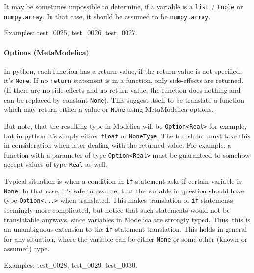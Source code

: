 \documentclass[a4paper,10pt]{article}
\begin{document}
It may be sometimes impossible to determine, if a variable is a {\tt list} / {\tt tuple} or {\tt numpy.array}. In that case,
it should be assumed to be {\tt numpy.array}.

Examples: test\_0025,  test\_0026,  test\_0027.


\paragraph{Options (MetaModelica)}
In python, each function has a return value, if the return value is not specified, it's {\tt None}. 
If no {\tt return} statement is in a function, only side-effects are returned. (If there are no side effects 
and no return value, the function does nothing and can be replaced by constant {\tt None}).
This suggest itself to be translate a function which may return either a value or {\tt None} using MetaModelica options.

But note, that the resulting type in Modelica will be {\tt Option<Real>} for example, but in python it's simply either {\tt float} or
{\tt NoneType}. The translator must take this in consideration when later dealing with the returned value. For example,
a function with a parameter of type {\tt Option<Real>} must be guaranteed to somehow accept values of type {\tt Real} as well.

Typical situation is when a condition in {\tt if} statement asks if certain variable is {\tt None}. In that case, it's safe to assume,
that the variable in question should have type {\tt Option<...>} when translated. This makes translation of {\tt if} statements 
seemingly more complicated, but notice that such statements would not be translatable anyways, since variables in Modelica are strongly typed.
Thus, this is an unambiguous extension to the {\tt if} statement translation. This holds in general for any situation, 
where the variable can be either {\tt None} or some other (known or assumed) type.

Examples: test\_0028,  test\_0029,  test\_0030.
\end{document}
